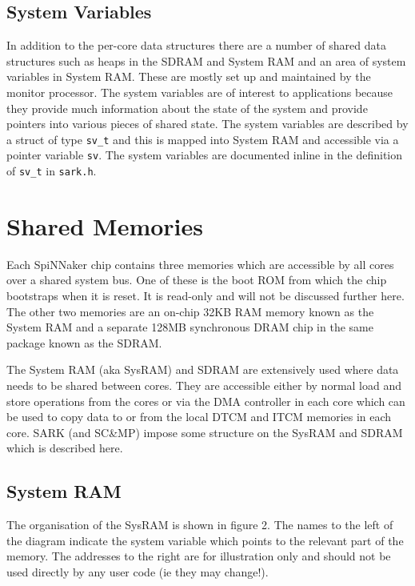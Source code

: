 \subsection{System Variables}

In addition to the per-core data structures there are a number of
shared data structures such as heaps in the SDRAM and System RAM and
an area of system variables in System RAM. These are mostly set up and
maintained by the monitor processor. The system variables are of
interest to applications because they provide much information about
the state of the system and provide pointers into various pieces of
shared state. The system variables are described by a struct of type
\texttt{sv\_t} and this is mapped into System RAM and accessible via
a pointer variable \texttt{sv}. The system variables are documented
inline in the definition of \texttt{sv\_t} in \texttt{sark.h}. 

\section{Shared Memories}

Each SpiNNaker chip contains three memories which are accessible by
all cores over a shared system bus. One of these is the boot ROM from
which the chip bootstraps when it is reset. It is read-only and will
not be discussed further here. The other two memories are an on-chip
32KB RAM memory known as the System RAM and a separate 128MB
synchronous DRAM chip in the same package known as the SDRAM.

The System RAM (aka SysRAM) and SDRAM are extensively used where data
needs to be shared between cores. They are accessible either by normal
load and store operations from the cores or via the DMA controller in
each core which can be used to copy data to or from the local DTCM and
ITCM memories in each core. SARK (and SC\&MP) impose some structure on
the SysRAM and SDRAM which is described here.

\subsection{System RAM}

The organisation of the SysRAM is shown in figure 2. The names to the
left of the diagram indicate the system variable which points to the
relevant part of the memory. The addresses to the right are for
illustration only and should not be used directly by any user code (ie
they may change!).


